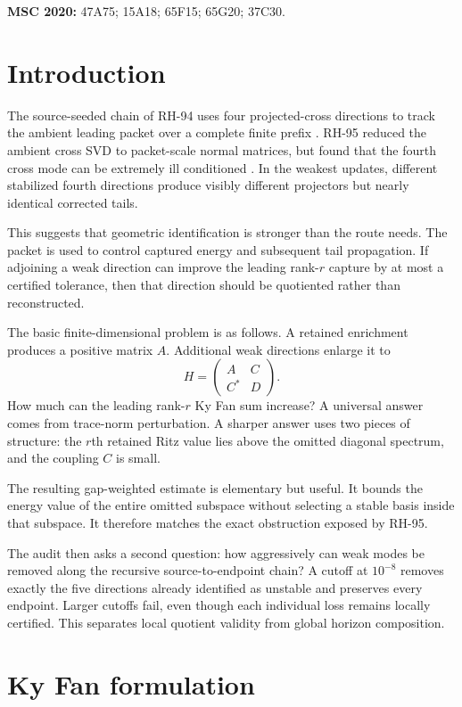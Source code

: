 \documentclass[11pt]{article}
\theoremstyle{definition}
\theoremstyle{remark}
\begin{document}
\medskip
\noindent\textbf{MSC 2020:} 47A75; 15A18; 65F15; 65G20; 37C30.

\section{Introduction}

The source-seeded chain of RH-94 uses four projected-cross directions to
track the ambient leading packet over a complete finite prefix
\citep{WangSourceSeed2026}.  RH-95 reduced the ambient cross SVD to
packet-scale normal matrices, but found that the fourth cross mode can be
extremely ill conditioned \citep{WangCrossMoment2026}.  In the weakest
updates, different stabilized fourth directions produce visibly different
projectors but nearly identical corrected tails.

This suggests that geometric identification is stronger than the route
needs.  The packet is used to control captured energy and subsequent tail
propagation.  If adjoining a weak direction can improve the leading rank-$r$
capture by at most a certified tolerance, then that direction should be
quotiented rather than reconstructed.

The basic finite-dimensional problem is as follows.  A retained enrichment
produces a positive matrix $A$.  Additional weak directions enlarge it to
\[
 H=\begin{pmatrix}A&C\\C^*&D\end{pmatrix}.
\]
How much can the leading rank-$r$ Ky Fan sum increase?  A universal answer
comes from trace-norm perturbation.  A sharper answer uses two pieces of
structure: the $r$th retained Ritz value lies above the omitted diagonal
spectrum, and the coupling $C$ is small.

The resulting gap-weighted estimate is elementary but useful.  It bounds the
energy value of the entire omitted subspace without selecting a stable basis
inside that subspace.  It therefore matches the exact obstruction exposed by
RH-95.

The audit then asks a second question: how aggressively can weak modes be
removed along the recursive source-to-endpoint chain?  A cutoff at $10^{-8}$
removes exactly the five directions already identified as unstable and
preserves every endpoint.  Larger cutoffs fail, even though each individual
loss remains locally certified.  This separates local quotient validity from
global horizon composition.

\section{Ky Fan formulation}
\label{sec:kyfan}
\end{document}
